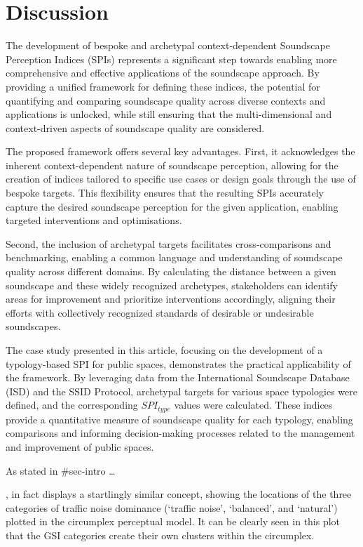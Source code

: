 \documentclass[
  authoryear,
  preprint,
  3p]{elsarticle}
\begin{document}
\section{Discussion}\label{discussion}

The development of bespoke and archetypal context-dependent Soundscape
Perception Indices (SPIs) represents a significant step towards enabling
more comprehensive and effective applications of the soundscape
approach. By providing a unified framework for defining these indices,
the potential for quantifying and comparing soundscape quality across
diverse contexts and applications is unlocked, while still ensuring that
the multi-dimensional and context-driven aspects of soundscape quality
are considered.

The proposed framework offers several key advantages. First, it
acknowledges the inherent context-dependent nature of soundscape
perception, allowing for the creation of indices tailored to specific
use cases or design goals through the use of bespoke targets. This
flexibility ensures that the resulting SPIs accurately capture the
desired soundscape perception for the given application, enabling
targeted interventions and optimisations.

Second, the inclusion of archetypal targets facilitates
cross-comparisons and benchmarking, enabling a common language and
understanding of soundscape quality across different domains. By
calculating the distance between a given soundscape and these widely
recognized archetypes, stakeholders can identify areas for improvement
and prioritize interventions accordingly, aligning their efforts with
collectively recognized standards of desirable or undesirable
soundscapes.

The case study presented in this article, focusing on the development of
a typology-based SPI for public spaces, demonstrates the practical
applicability of the framework. By leveraging data from the
International Soundscape Database (ISD) and the SSID Protocol,
archetypal targets for various space typologies were defined, and the
corresponding \(SPI_{type}\) values were calculated. These indices
provide a quantitative measure of soundscape quality for each typology,
enabling comparisons and informing decision-making processes related to
the management and improvement of public spaces.

As stated in \#sec-intro \ldots{}

\citep[Fig.6]{Kogan2018Green}, in fact displays a startlingly similar
concept, showing the locations of the three categories of traffic noise
dominance (`traffic noise', `balanced', and `natural') plotted in the
circumplex perceptual model. It can be clearly seen in this plot that
the GSI categories create their own clusters within the circumplex.
\end{document}
